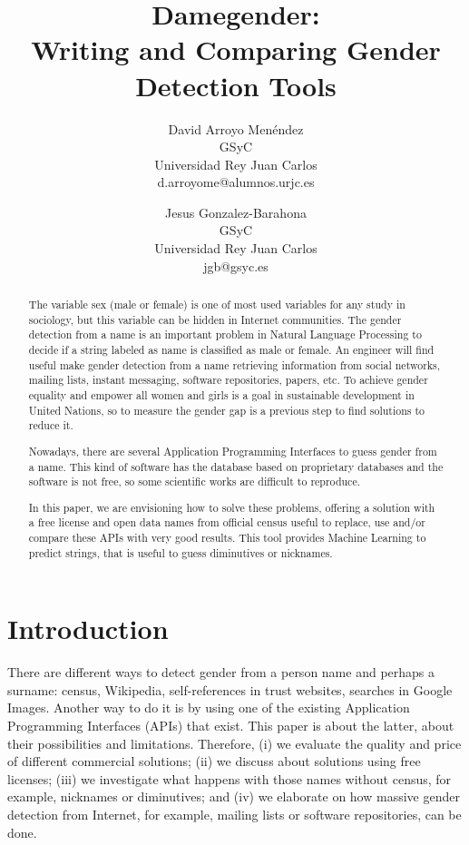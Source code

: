 \documentclass[a4paper]{article}
\title{Damegender: \\ Writing and Comparing Gender Detection Tools}
\author{
David Arroyo Men\'endez \\ GSyC \\ Universidad Rey Juan Carlos \\ d.arroyome@alumnos.urjc.es
\and
Jesus Gonzalez-Barahona \\ GSyC \\ Universidad Rey Juan Carlos \\ jgb@gsyc.es
}
\begin{document}
\maketitle

\begin{abstract}

The variable sex (male or female) is one of most used variables for
any study in sociology, but this variable can be hidden in Internet
communities. The gender detection from a name is an important problem
in Natural Language Processing to decide if a string labeled as name
is classified as male or female. An engineer will find useful
make gender detection from a name retrieving information from social
networks, mailing lists, instant messaging, software repositories,
papers, etc. To achieve gender equality and empower all women and
girls is a goal in sustainable development in United Nations, so to
measure the gender gap is a previous step to find solutions to reduce
it.

Nowadays, there are several Application Programming Interfaces to
guess gender from a name. This kind of software has the database
based on proprietary databases and the software is not free, so some
scientific works are difficult to reproduce.

In this paper, we are envisioning how to solve these problems,
offering a solution with a free license and open data names from
official census useful to replace, use and/or compare these APIs with
very good results. This tool provides Machine Learning to predict
strings, that is useful to guess diminutives or nicknames.
\end{abstract}


\section{Introduction}


There are different ways to detect gender from a person name and
perhaps a surname: census, Wikipedia, self-references in trust
websites, searches in Google Images.
Another way to do it is by using one of the existing Application Programming Interfaces (APIs) that exist.
This paper is about the latter, about their possibilities and limitations.
Therefore, (i) we evaluate the quality and price of different commercial solutions;
(ii) we discuss about solutions using free licenses;
(iii) we investigate what happens with those names without census, for example, nicknames or diminutives; and
(iv) we elaborate on how massive gender detection from Internet, for example, mailing
  lists or software repositories, can be done.
\end{document}
